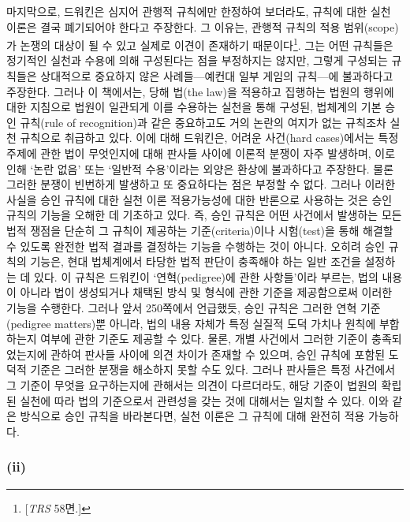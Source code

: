 마지막으로, 드워킨은 심지어 관행적 규칙에만 한정하여 보더라도, 규칙에
대한 실천 이론은 결국 폐기되어야 한다고 주장한다. 그 이유는, 관행적
규칙의 적용 범위(scope)가 논쟁의 대상이 될 수 있고 실제로 이견이
존재하기 때문이다\footnote{{[}\emph{TRS} 58면.{]}}. 그는 어떤 규칙들은
정기적인 실천과 수용에 의해 구성된다는 점을 부정하지는 않지만, 그렇게
구성되는 규칙들은 상대적으로 중요하지 않은 사례들---예컨대 일부 게임의
규칙---에 불과하다고 주장한다. 그러나 이 책에서는, 당해 법(the law)을
적용하고 집행하는 법원의 행위에 대한 지침으로 법원이 일관되게 이를
수용하는 실천을 통해 구성된, 법체계의 기본 승인 규칙(rule of
recognition)과 같은 중요하고도 거의 논란의 여지가 없는 규칙조차 실천
규칙으로 취급하고 있다. 이에 대해 드워킨은, 어려운 사건(hard
cases)에서는 특정 주제에 관한 법이 무엇인지에 대해 판사들 사이에 이론적
분쟁이 자주 발생하며, 이로 인해 `논란 없음' 또는 `일반적 수용'이라는
외양은 환상에 불과하다고 주장한다. 물론 그러한 분쟁이 빈번하게 발생하고
또 중요하다는 점은 부정할 수 없다. 그러나 이러한 사실을 승인 규칙에 대한
실천 이론 적용가능성에 대한 반론으로 사용하는 것은 승인 규칙의 기능을
오해한 데 기초하고 있다. 즉, 승인 규칙은 어떤 사건에서 발생하는 모든
법적 쟁점을 단순히 그 규칙이 제공하는 기준(criteria)이나 시험(test)을
통해 해결할 수 있도록 완전한 법적 결과를 결정하는 기능을 수행하는 것이
아니다. 오히려 승인 규칙의 기능은, 현대 법체계에서 타당한 법적 판단이
충족해야 하는 일반 조건을 설정하는 데 있다. 이 규칙은 드워킨이
`연혁(pedigree)에 관한 사항들'이라 부르는, 법의 내용이 아니라 법이
생성되거나 채택된 방식 및 형식에 관한 기준을 제공함으로써 이러한 기능을
수행한다. 그러나 앞서 250쪽에서 언급했듯, 승인 규칙은 그러한 연혁
기준(pedigree matters)뿐 아니라, 법의 내용 자체가 특정 실질적 도덕
가치나 원칙에 부합하는지 여부에 관한 기준도 제공할 수 있다. 물론, 개별
사건에서 그러한 기준이 충족되었는지에 관하여 판사들 사이에 의견 차이가
존재할 수 있으며, 승인 규칙에 포함된 도덕적 기준은 그러한 분쟁을
해소하지 못할 수도 있다. 그러나 판사들은 특정 사건에서 그 기준이 무엇을
요구하는지에 관해서는 의견이 다르더라도, 해당 기준이 법원의 확립된
실천에 따라 법의 기준으로서 관련성을 갖는 것에 대해서는 일치할 수 있다.
이와 같은 방식으로 승인 규칙을 바라본다면, 실천 이론은 그 규칙에 대해
완전히 적용 가능하다.

\subsubsection{\texorpdfstring{(ii) }{(ii) 규칙(rules)과 원칙(principles)}}\label{ii-uxaddcuxce59rulesuxacfc-uxc6d0uxce59principles}

